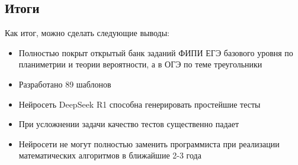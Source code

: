 \documentclass[a4paper, 12pt]{extarticle}
\begin{document}
\subsection*{Итоги}
Как итог, можно сделать следующие выводы:
\begin{itemize}
        \item Полностью покрыт открытый банк заданий ФИПИ ЕГЭ базового уровня по планиметрии и теории вероятности, а в ОГЭ по теме треугольники
		\item Разработано 89 шаблонов
		\item Нейросеть DeepSeek R1 способна генерировать простейшие тесты
		\item При усложнении задачи качество тестов существенно падает
		\item Нейросети не могут полностью заменить программиста при реализации математических алгоритмов в ближайшие 2-3 года
\end{itemize}
\end{document}

